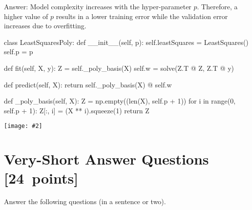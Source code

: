 \documentclass{article}
\newcommand{\blu}[1]{{\textcolor{blu}{#1}}}
\newenvironment{answer}{\par\begingroup\color{gre}Answer: }{\endgroup}
\let\ask\blu
\newcommand\pts[1]{\textcolor{pointscolour}{[#1~points]}}
\newcommand{\centerfig}[2]{\begin{center}\texttt{[image: \#2]}\end{center}}
\begin{document}
\begin{answer}
    Model complexity increases with the hyper-parameter $p$. Therefore, a higher value of $p$ results in a lower training error while the validation error increases due to overfitting.
\end{answer}
\begin{python}
class LeastSquaresPoly:
    def __init__(self, p):
        self.leastSquares = LeastSquares()
        self.p = p

    def fit(self, X, y):
        Z = self._poly_basis(X)
        self.w = solve(Z.T @ Z, Z.T @ y)

    def predict(self, X):
        return self._poly_basis(X) @ self.w

    def _poly_basis(self, X):
        Z = np.empty((len(X), self.p + 1))
        for i in range(0, self.p + 1):
            Z[:, i] = (X ** i).squeeze(1)
        return Z
\end{python}

\centerfig{0.7}{figs/polynomial_error_curves}

\clearpage
\section{Very-Short Answer Questions \pts{24}}

\ask{Answer the following questions (in a sentence or two).}
\end{document}
